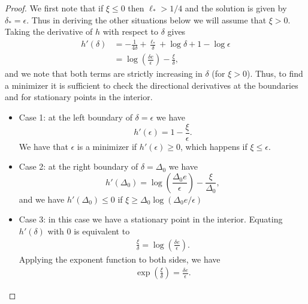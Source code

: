 \documentclass[10pt,a4paper]{amsart}
\begin{document}
\begin{proof}
We first note that if $\xi \leq 0$ then $\ell_* > 1/4$ and 
 the solution is given by $\delta_*=\epsilon$. Thus in deriving the other situations below we will assume that $\xi > 0$.
    Taking the derivative of $h$  with respect to $\delta$ gives
    \begin{align*}
h'(\delta) & = -\frac{1}{4\delta} + \frac{\ell_*}{\delta} + \log\delta + 1 -\log\epsilon\\
& = \log\left(\frac{\delta e}{\epsilon}\right) - \frac{\xi}{\delta},
    \end{align*}
    and we note that both terms are strictly increasing in $\delta$ (for $\xi > 0$). Thus,
to find a minimizer it is sufficient to check the directional derivatives at the boundaries and for stationary points in the interior.
    \begin{itemize}
    \item Case 1: at the left boundary of $\delta = \epsilon$ we have
    \[
    h'(\epsilon) = 1 - \frac \xi \epsilon.
    \]
We have that $\epsilon$ is a minimizer if $h'(\epsilon) \geq 0$, which happens if $\xi \leq \epsilon$.
\item Case 2: at the right boundary of $\delta = \Delta_0$ we have
\[
h'(\Delta_0) = \log\left(\frac{\Delta_0 e}{\epsilon}\right) - \frac{\xi}{\Delta_0},
\]
and we have $h'(\Delta_0) \leq 0$ if $\xi \geq \Delta_0\log(\Delta_0 e/\epsilon)$
\item Case 3: in this case we have a stationary point in the interior. 
        Equating $h'(\delta)$ with 0 is equivalent to 
\begin{align*}
    \frac{\xi}{\delta} = \log\left(\frac{\delta e}{\epsilon}\right).
\end{align*}
Applying the exponent function to both sides, we have
\begin{align*}
    \exp\left(\frac \xi \delta\right) = \frac{\delta e}{\epsilon}.
\end{align*}

\end{itemize}
\end{proof}
\end{document}
